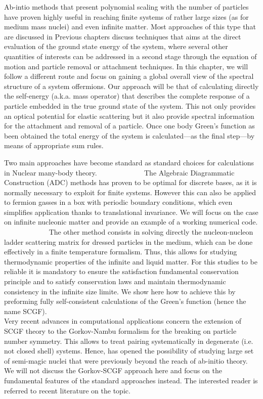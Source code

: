 Ab-intio methods that present polynomial scaling with the number of particles have proven highly useful in reaching
finite systems of rather large sizes (as for medium mass nuclei) and even infinite matter. Most approaches of this type that are discussed in Previous chapters discuss techniques that aims at the direct evaluation of the ground state energy of the system, where several other quantities of interests can be addressed in a second stage through the equation of motion and particle removal or attachment techniques.
%
In this chapter, we will follow a different route and focus on gaining a global overall view of the spectral structure of a system offermions. Our approach will be that of calculating directly the self-energy (a.k.a. mass operator) that describes the 
complete response of a particle embedded in the true ground state of the system. This not only provides an optical potential for elastic scattering but it also provide spectral information for the attachment and removal of a particle.   Once one body Green's function as been obtained the total energy of the system is calculated---as the final step---by means of appropriate sum rules.

Two main approaches have become standard as standard choices for calculations in Nuclear many-body theory.
\hbox{~~~~~~~~~~~~} 
The Algebraic Diagrammatic Construction (ADC) methods has proven to be optimal for discrete bases, as it is normally necessary to exploit for finite systems. However this can also be applied to fermion gasses in a box with periodic boundary conditions, which even simplifies application thanks to translational invariance. We will focus on the case on infinite nucleonic matter and provide an example of a working numerical code.
\hbox{~~~~~~~~~~~~}
The other method consists in solving directly the nucleon-nucleon ladder scattering matrix for dressed particles in the medium, which can be done effectively in a finite temperature formalism. Thus, this allows for studying thermodynamic properties of the infinite and liquid matter. For this studies to be reliable it is mandatory to ensure the satisfaction fundamental conservation principle and to satisfy conservation laws and maintain thermodynamic consistency in the infinite size limite. We show here how to achieve this by preforming fully self-consistent calculations of the Green's function (hence the name SCGF).
\hbox{~~~~~~~~~~~~}\\
Very recent advances in computational applications concern the extension of SCGF theory to the Gorkov-Nambu formalism for the breaking on particle number symmetry. This allows to  treat pairing systematically in degenerate (i.e. not closed shell) systems. Hence, has opened the possibility of  studying large set of semi-magic nuclei that were previously beyond the reach of ab-initio theory. We will not discuss the Gorkov-SCGF approach here and focus on the fundamental features of the standard approaches instead. The interested reader is referred to  recent literature on the topic.

